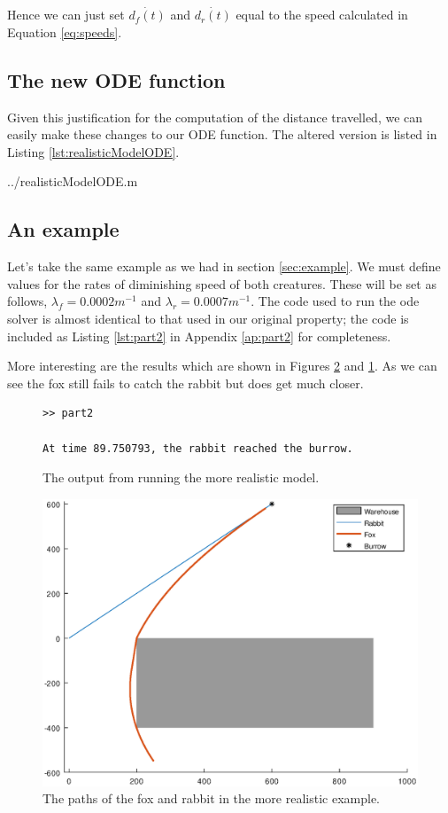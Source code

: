 Hence we can just set $\dot{d_f(t)}$ and $\dot{d_r(t)}$ equal to the speed calculated in Equation \ref{eq:speeds}. 

\subsection{The new ODE function}

Given this justification for the computation of the distance travelled, we can easily make these changes to our ODE function. The altered version is listed in Listing \ref{lst:realisticModelODE}.

  {../realisticModelODE.m}

\subsection{An example}

Let's take the same example as we had in section \ref{sec:example}. We must define values for the rates of diminishing speed of both creatures. These will be set as follows, $\lambda_f =0.0002 m^{-1}$ and  $\lambda_r =0.0007 m^{-1}$. The code used to run the ode solver is almost identical to that used in our original property; the code is included as Listing \ref{lst:part2} in Appendix \ref{ap:part2} for completeness.

More interesting are the results which are shown in Figures \ref{fig:realisticModel} and \ref{output:complex}. As we can see the fox still fails to catch the rabbit but does get much closer.

 \begin{figure}[h]
 \caption{The output from running the more realistic model.}
 \label{output:complex}
 \begin{verbatim}
>> part2

At time 89.750793, the rabbit reached the burrow.

 \end{verbatim}
 \end{figure}

\begin{figure}[!hb]
\centering

   \caption{The paths of the fox and rabbit in the more realistic example.}
   \includegraphics[scale=0.5]{realisticModel.eps}

      \label{fig:realisticModel}
\end{figure}





